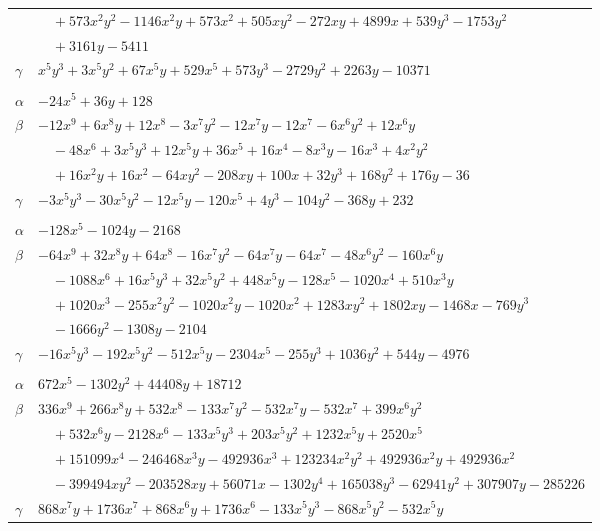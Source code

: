 \documentclass[11pt]{article}
\begin{document}
\begin{longtable}{@{}ll@{}}
 & $\quad +573x^{2}y^{2}-1146x^{2}y+573x^{2}+505xy^{2}-272xy+4899x+539y^{3}-1753y^{2}$\\
 & $\quad +3161y-5411$\\
$\gamma$ & $x^{5}y^{3}+3x^{5}y^{2}+67x^{5}y+529x^{5}+573y^{3}-2729y^{2}+2263y-10371$\\
\addlinespace[3pt]
\multicolumn{2}{@{}l}{$\{i,j\}=\{19,21\}$, $k_{ij}=2^{3}\cdot 5^{2}$}\\
$\alpha$ & $-24x^{5}+36y+128$\\
$\beta$ & $-12x^{9}+6x^{8}y+12x^{8}-3x^{7}y^{2}-12x^{7}y-12x^{7}-6x^{6}y^{2}+12x^{6}y$\\
 & $\quad -48x^{6}+3x^{5}y^{3}+12x^{5}y+36x^{5}+16x^{4}-8x^{3}y-16x^{3}+4x^{2}y^{2}$\\
 & $\quad +16x^{2}y+16x^{2}-64xy^{2}-208xy+100x+32y^{3}+168y^{2}+176y-36$\\
$\gamma$ & $-3x^{5}y^{3}-30x^{5}y^{2}-12x^{5}y-120x^{5}+4y^{3}-104y^{2}-368y+232$\\
\addlinespace[3pt]
\multicolumn{2}{@{}l}{$\{i,j\}=\{19,27\}$, $k_{ij}=2^{3}\cdot 3\cdot 5\cdot 17$}\\
$\alpha$ & $-128x^{5}-1024y-2168$\\
$\beta$ & $-64x^{9}+32x^{8}y+64x^{8}-16x^{7}y^{2}-64x^{7}y-64x^{7}-48x^{6}y^{2}-160x^{6}y$\\
 & $\quad -1088x^{6}+16x^{5}y^{3}+32x^{5}y^{2}+448x^{5}y-128x^{5}-1020x^{4}+510x^{3}y$\\
 & $\quad +1020x^{3}-255x^{2}y^{2}-1020x^{2}y-1020x^{2}+1283xy^{2}+1802xy-1468x-769y^{3}$\\
 & $\quad -1666y^{2}-1308y-2104$\\
$\gamma$ & $-16x^{5}y^{3}-192x^{5}y^{2}-512x^{5}y-2304x^{5}-255y^{3}+1036y^{2}+544y-4976$\\
\addlinespace[3pt]
\multicolumn{2}{@{}l}{$\{i,j\}=\{19,29\}$, $k_{ij}=2^{5}\cdot 3\cdot 5$}\\
$\alpha$ & $672x^{5}-1302y^{2}+44408y+18712$\\
$\beta$ & $336x^{9}+266x^{8}y+532x^{8}-133x^{7}y^{2}-532x^{7}y-532x^{7}+399x^{6}y^{2}$\\
 & $\quad +532x^{6}y-2128x^{6}-133x^{5}y^{3}+203x^{5}y^{2}+1232x^{5}y+2520x^{5}$\\
 & $\quad +151099x^{4}-246468x^{3}y-492936x^{3}+123234x^{2}y^{2}+492936x^{2}y+492936x^{2}$\\
 & $\quad -399494xy^{2}-203528xy+56071x-1302y^{4}+165038y^{3}-62941y^{2}+307907y-285226$\\
$\gamma$ & $868x^{7}y+1736x^{7}+868x^{6}y+1736x^{6}-133x^{5}y^{3}-868x^{5}y^{2}-532x^{5}y$\\

\end{longtable}
\end{document}

